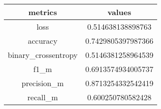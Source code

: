 \begin{table}[]
\begin{tabular}{|c|c|}
\hline
\textbf{metrics} & \textbf{values}\\\hline
loss & 0.514638138898763 \\ \hline
 accuracy & 0.7429805397987366 \\ \hline
 binary\_crossentropy & 0.5146381258964539 \\ \hline
 f1\_m & 0.6913574934005737 \\ \hline
 precision\_m & 0.8713254332542419 \\ \hline
 recall\_m & 0.600250780582428 \\ \hline
\end{tabular}
\end{table}
